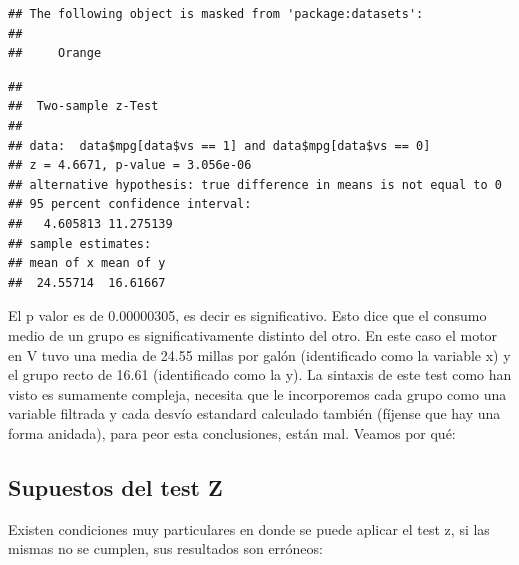 \documentclass[
]{book}
\newenvironment{Shaded}{\begin{snugshade}}{\end{snugshade}}
\newcommand{\AttributeTok}[1]{\textcolor[rgb]{0.77,0.63,0.00}{#1}}
\newcommand{\DecValTok}[1]{\textcolor[rgb]{0.00,0.00,0.81}{#1}}
\newcommand{\FunctionTok}[1]{\textcolor[rgb]{0.00,0.00,0.00}{#1}}
\newcommand{\NormalTok}[1]{#1}
\newcommand{\SpecialCharTok}[1]{\textcolor[rgb]{0.00,0.00,0.00}{#1}}
\begin{document}
\begin{verbatim}
## The following object is masked from 'package:datasets':
## 
##     Orange
\end{verbatim}

\begin{Shaded}
\end{Shaded}

\begin{verbatim}
## 
##  Two-sample z-Test
## 
## data:  data$mpg[data$vs == 1] and data$mpg[data$vs == 0]
## z = 4.6671, p-value = 3.056e-06
## alternative hypothesis: true difference in means is not equal to 0
## 95 percent confidence interval:
##   4.605813 11.275139
## sample estimates:
## mean of x mean of y 
##  24.55714  16.61667
\end{verbatim}

El p valor es de 0.00000305, es decir es significativo. Esto dice que el consumo medio de un grupo es significativamente distinto del otro. En este caso el motor en V tuvo una media de 24.55 millas por galón (identificado como la variable x) y el grupo recto de 16.61 (identificado como la y). La sintaxis de este test como han visto es sumamente compleja, necesita que le incorporemos cada grupo como una variable filtrada y cada desvío estandard calculado también (fíjense que hay una forma anidada), para peor esta conclusiones, están mal. Veamos por qué:

\hypertarget{supuestos-del-test-z}{%
\subsection{Supuestos del test Z}\label{supuestos-del-test-z}}

Existen condiciones muy particulares en donde se puede aplicar el test z, si las mismas no se cumplen, sus resultados son erróneos:
\end{document}
